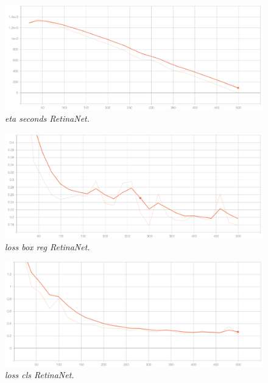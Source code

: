 \begin{figure}[h!]
\begin{center} 
\includegraphics[scale=0.35]{figures/eta_seconds_retinanet_2}
\caption{\small \sl eta seconds RetinaNet. \label{fig:eta_seconds_retinanet}}
\end{center}
\end{figure}

\begin{figure}[h!]
\begin{center} 
\includegraphics[scale=0.35]{figures/loss_box_reg_retinanet_3}
\caption{\small \sl loss box reg RetinaNet. \label{fig:loss_box_reg_retinanet}}
\end{center}
\end{figure}

\begin{figure}[h!]
\begin{center} 
\includegraphics[scale=0.35]{figures/loss_cls_retinanet_4}
\caption{\small \sl loss cls RetinaNet. \label{fig:loss_cls_retinanet}}
\end{center}
\end{figure}

